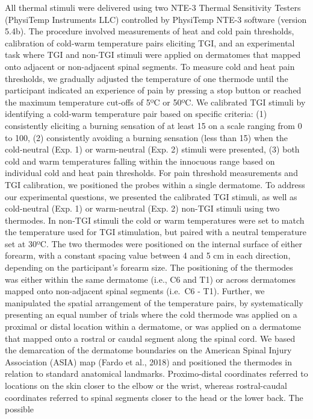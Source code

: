 \documentclass[
]{article}
\begin{document}
All thermal stimuli were delivered using two NTE-3 Thermal Sensitivity
Testers (PhysiTemp Instruments LLC) controlled by PhysiTemp NTE-3
software (version 5.4b). The procedure involved measurements of heat and
cold pain thresholds, calibration of cold-warm temperature pairs
eliciting TGI, and an experimental task where TGI and non-TGI stimuli
were applied on dermatomes that mapped onto adjacent or non-adjacent
spinal segments. To measure cold and heat pain thresholds, we gradually
adjusted the temperature of one thermode until the participant indicated
an experience of pain by pressing a stop button or reached the maximum
temperature cut-offs of 5ºC or 50ºC. We calibrated TGI stimuli by
identifying a cold-warm temperature pair based on specific criteria: (1)
consistently eliciting a burning sensation of at least 15 on a scale
ranging from 0 to 100, (2) consistently avoiding a burning sensation
(less than 15) when the cold-neutral (Exp. 1) or warm-neutral (Exp. 2)
stimuli were presented, (3) both cold and warm temperatures falling
within the innocuous range based on individual cold and heat pain
thresholds. For pain threshold measurements and TGI calibration, we
positioned the probes within a single dermatome. To address our
experimental questions, we presented the calibrated TGI stimuli, as well
as cold-neutral (Exp. 1) or warm-neutral (Exp. 2) non-TGI stimuli using
two thermodes. In non-TGI stimuli the cold or warm temperatures were set
to match the temperature used for TGI stimulation, but paired with a
neutral temperature set at 30ºC. The two thermodes were positioned on
the internal surface of either forearm, with a constant spacing value
between 4 and 5 cm in each direction, depending on the participant's
forearm size. The positioning of the thermodes was either within the
same dermatome (i.e., C6 and T1) or across dermatomes mapped onto
non-adjacent spinal segments (i.e.~C6 - T1). Further, we manipulated the
spatial arrangement of the temperature pairs, by systematically
presenting an equal number of trials where the cold thermode was applied
on a proximal or distal location within a dermatome, or was applied on a
dermatome that mapped onto a rostral or caudal segment along the spinal
cord. We based the demarcation of the dermatome boundaries on the
American Spinal Injury Association (ASIA) map (Fardo et al., 2018) and
positioned the thermodes in relation to standard anatomical landmarks.
Proximo-distal coordinates referred to locations on the skin closer to
the elbow or the wrist, whereas rostral-caudal coordinates referred to
spinal segments closer to the head or the lower back. The possible
\end{document}
